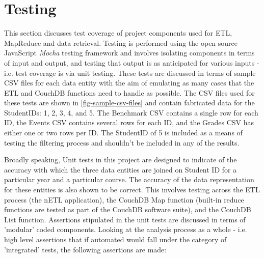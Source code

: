 \section{Testing}
This section discusses test coverage of project components used for ETL, MapReduce and data retrieval. Testing is performed using the open source JavaScript \textit{Mocha} testing framework \cite{mochaTest} and involves isolating components in terms of input and output, and testing that output is as anticipated for various inputs - i.e. test coverage is via unit testing. These tests are discussed in terms of sample CSV files for each data entity with the aim of emulating as many cases that the ETL and CouchDB functions need to handle as possible. The CSV files used for these tests are shown in \ref{fig-sample-csv-files} and contain fabricated data for the StudentIDs: 1, 2, 3, 4, and 5. The Benchmark CSV contains a single row for each ID, the Events CSV contains several rows for each ID, and the Grades CSV has either one or two rows per ID. The StudentID of 5 is included as a means of testing the filtering process and shouldn't be included in any of the results.

Broadly speaking, Unit tests in this project are designed to indicate of the accuracy with which the three data entities are joined on Student ID for a particular year and a particular course. The accuracy of the data representation for these entities is also shown to be correct. This involves testing across the ETL process (the nETL application), the CouchDB Map function (built-in reduce functions are tested as part of the CouchDB software suite), and the CouchDB List function. Assertions stipulated in the unit tests are discussed in terms of 'modular' coded components. Looking at the analysis process as a whole - i.e. high level assertions that if automated would fall under the category of 'integrated' tests, the following assertions are made:


